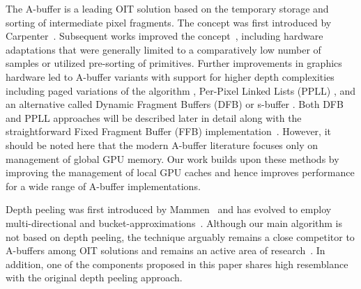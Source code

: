 \documentclass{egpubl}
\newcommand{\red}[1]{{\color{red}#1}}
\newcommand{\yellow}[1]{{\color{Goldenrod}#1}}
\newcommand{\green}[1]{{\color{PineGreen}#1}}
\newcommand{\minor}[1]{\yellow{#1}}
\newcommand{\new}[1]{\green{#1}}
\newcommand{\ab}{\mbox{A-buffer}}
\begin{document}
\new{
The \ab{} is a leading OIT solution based on the temporary storage and sorting of intermediate pixel fragments. 
} 
\minor{
The concept was first introduced by Carpenter~\cite{Carpenter1984}. 
Subsequent works improved the concept~\cite{ebert1990abuffer,bavoil2007multifragkbuffer,myers2007techrep,Kerzner2013,Vasilakis2014}, including hardware adaptations that were generally limited to a comparatively low number of samples or utilized pre-sorting of primitives. 
Further improvements in graphics hardware led to \ab{} variants with support for higher depth complexities including paged variations of the algorithm \cite{kainz2009ray,Crassin2010}, Per-Pixel Linked Lists (PPLL) \cite{Yang2010}, and an alternative called Dynamic Fragment Buffers (DFB) or s-buffer \cite{Maule2012,Vasilakis2012}. 
} 
%
Both DFB and PPLL approaches will be described later in detail along with the straightforward Fixed Fragment Buffer (FFB) implementation~\cite{Crassin2010}. 
However, it should be noted here that the modern \ab{} literature focuses only on management of global GPU memory. 
Our work builds upon these methods by improving the management of local GPU caches and hence improves performance for a wide range of \ab{} implementations.

Depth peeling was first introduced by Mammen~\cite{Mammen1989} and has evolved to employ multi-directional and bucket-approximations~\cite{Everitt2001,carr2008depthpeel,Bavoil2008,Liu2009}. 
Although our main algorithm is not based on depth peeling, the technique arguably remains a close competitor to \ab{}s among OIT solutions \new{and remains an active area of research~\cite{Vasilakis2013}}. 
In addition, one of the components proposed in this paper shares high resemblance with the original depth peeling approach. 


\end{document}

